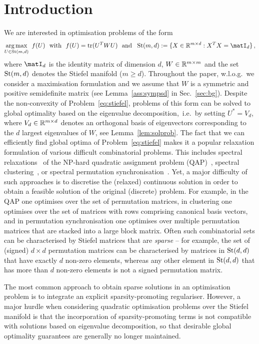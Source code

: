 \documentclass{article}
\begin{document}
\section{Introduction}
We are interested in optimisation problems of the form
\begin{align}\label{eq:stiefel}
    \argmax_{U \in \St(m,d)} ~f(U) ~~\text{with}~~ f(U) =\tr(U^T W U) ~~\text{and}~~ \St(m,d) := \{X \in \R^{m \times d}: X^T X = \matI_d\}\,,
\end{align}
where $\matI_d$ is the identity matrix of dimension $d$, $W \in \mathbb{R}^{m \times m}$ and the set $\operatorname{St}(m,d)$ denotes the Stiefel manifold ($m \geq d$). Throughout the paper, w.l.o.g.~we consider a maximisation formulation and we assume that $W$ is a symmetric and positive semidefinite matrix (see Lemma~\ref{ass:sympsd} in Sec.~\ref{sec:bg}). Despite the non-convexity of Problem~\eqref{eq:stiefel}, problems of this form can be solved to global optimality based on the eigenvalue decomposition,~i.e.~by setting $U^* = V_d$, where $V_d \in \mathbb{R}^{m \times d}$ denotes an orthogonal basis of eigenvectors corresponding to the $d$ largest eigenvalues of $W$, see Lemma~\ref{lem:solprob}. The fact that we can efficiently find global optima of Problem~\eqref{eq:stiefel} makes it a popular relaxation formulation of various difficult combinatorial problems. This includes spectral relaxations~\cite{umeyama1988eigendecomposition,Leordeanu:2005ur,Cour:2006un} of the NP-hard quadratic assignment problem (QAP)~\cite{Pardalos:1993uo}, spectral clustering~\cite{ng2001spectral,von2007tutorial}, or spectral permutation synchronisation~\cite{Pachauri:2013wx,shen2016normalized,Maset:YO8y6VRb}. Yet, a major difficulty of such approaches is to discretise the (relaxed) continuous solution in order to obtain a feasible solution of the original (discrete) problem. For example, in the QAP one optimises over the set of permutation matrices, in  clustering one optimises over the set of matrices with rows comprising canonical basis vectors, and in permutation synchronisation one optimises over multiple permutation matrices that are stacked into a large block matrix. Often such combinatorial sets can be characterised by Stiefel matrices that are \emph{sparse} -- for example, the set of (signed) $d {\times} d$ permutation matrices can be characterised by matrices in $\operatorname{St}(d,d)$ that have exactly $d$ non-zero elements, whereas any other element in $\operatorname{St}(d,d)$  that has more than $d$ non-zero elements is not a signed permutation matrix.

The most common approach to obtain sparse solutions in an optimisation problem is to integrate an explicit sparsity-promoting regulariser.
However, a major hurdle when considering quadratic optimisation problems over the Stiefel manifold is that the incorporation of sparsity-promoting terms is not compatible with solutions based on eigenvalue decomposition, so that desirable global optimality guarantees are generally no longer maintained.
\end{document}
